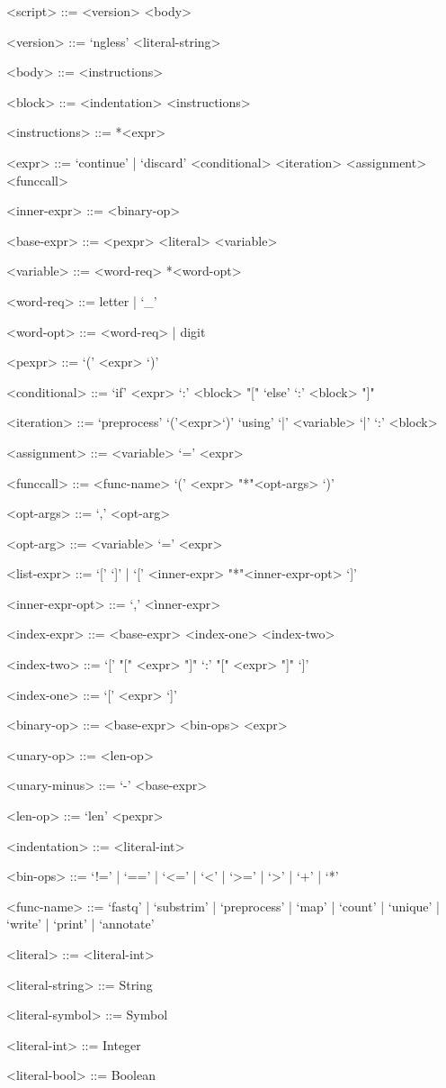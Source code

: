 \documentclass{article}
\begin{document}
\begin{grammar}

<script>  ::= <version> <body>

<version> ::= `ngless' <literal-string>

<body>    ::= <instructions>

<block>   ::= <indentation> <instructions>

<instructions> ::= *<expr>

<expr> ::=   `continue' | `discard'
\alt <conditional>
\alt <iteration>
\alt <assignment>
\alt <funccall>

<inner-expr> ::= <binary-op>

<base-expr>  ::= <pexpr>
\alt <literal>
\alt <variable>

<variable> ::= <word-req> *<word-opt>

<word-req> ::= {letter} | `\_'

<word-opt> ::= <word-req> | {digit}

<pexpr> ::= `(' <expr> `)'

<conditional> ::= `if' <expr> `:' <block> "[" `else' `:' <block> "]"

<iteration> ::= `preprocess' `('<expr>`)' `using' `|' <variable> `|' `:' <block>

<assignment> ::= <variable> `=' <expr>

<funccall>  ::= <func-name> `(' <expr> "*"<opt-args> `)'

<opt-args> ::= `,' <opt-arg>

<opt-arg>  ::= <variable> `=' <expr>

<list-expr>  ::= `[' `]' | `[' <inner-expr> "*"<inner-expr-opt> `]'

<inner-expr-opt> ::= `,' <ìnner-expr>

<index-expr> ::= <base-expr> <index-one>
 <index-two>

<index-two>  ::= `[' "[" <expr> "]" `:' "[" <expr> "]" `]'

<index-one>  ::= `[' <expr> `]'

<binary-op> ::= <base-expr> <bin-ops> <expr>

<unary-op> ::= <len-op>

<unary-minus> ::= `-' <base-expr>

<len-op> ::= `len' <pexpr>

<indentation> ::= <literal-int>

<bin-ops> ::= `!=' | `==' | `<=' | `<' | `>=' | `>' | `+' | `*'

<func-name>   ::= `fastq' | `substrim' | `preprocess' | `map' | `count' | `unique' | `write' | `print' | `annotate'

<literal> ::= <literal-int>

<literal-string> ::= String

<literal-symbol> ::= Symbol

<literal-int> ::= Integer

<literal-bool> ::= Boolean

\end{grammar}
\end{document}

